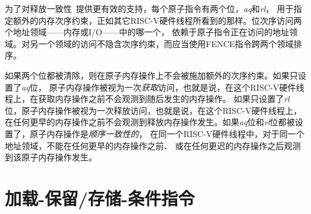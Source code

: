 为了对释放一致性~\cite{Gharachorloo90memoryconsistency}提供更有效的支持，每个原子指令有两个位，{\em aq}和{\em rl}，
用于指定额外的内存次序约束，正如其它RISC-V硬件线程所看到的那样。位次序访问两个地址领域——内存或I/O——中的哪一个，
依赖于原子指令正在访问的地址领域。对另一个领域的访问不隐含次序约束，而应当使用FENCE指令跨两个领域排序。

如果两个位都被清除，则在原子内存操作上不会被施加额外的次序约束。如果只设置了{\em aq}位，
原子内存操作被视为一次{\em 获取}访问，也就是说，在这个RISC-V硬件线程上，在获取内存操作之前不会观测到随后发生的内存操作。
如果只设置了{\em rl}位，原子内存操作被视为一次释放访问，也就是说，在这个RISC-V硬件线程上，
在任何更早的内存操作之前不会观测到释放内存操作发生。如果{\em aq}位和{\em rl}位都被设置了，原子内存操作是{\em 顺序一致性的}，
在同一个RISC-V硬件线程中，对于同一个地址领域，不能在任何更早的内存操作之前、
或在任何更迟的内存操作之后观测到该原子内存操作发生。

\section{加载-保留/存储-条件指令}
\label{sec:lrsc}

